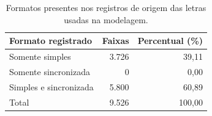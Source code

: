 \begin{table}[H]\centering\small
\caption{Formatos presentes nos registros de origem das letras usadas na modelagem.}\label{tab:formatos_coorte}
\begin{tabular}{lrr}\toprule
Formato registrado & Faixas & Percentual (\%) \\\midrule
Somente simples & 3.726 & 39,11 \\
Somente sincronizada & 0 & 0,00 \\
Simples e sincronizada & 5.800 & 60,89 \\
Total & 9.526 & 100,00 \\
\bottomrule\end{tabular}
\end{table}
